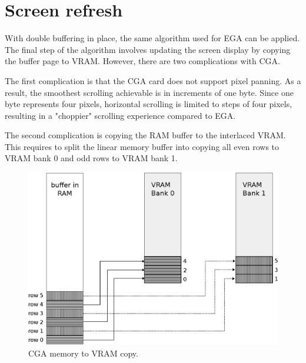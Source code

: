 \documentclass[book.tex]{subfiles}
\begin{document}
\section{Screen refresh}
With double buffering in place, the same algorithm used for EGA can be applied. The final step of the algorithm involves updating the screen display by copying the buffer page to VRAM. However, there are two complications with CGA.\\

\par
The first complication is that the CGA card does not support pixel panning. As a result, the smoothest scrolling achievable is in increments of one byte. Since one byte represents four pixels, horizontal scrolling is limited to steps of four pixels, resulting in a "choppier" scrolling experience compared to EGA. \\

\par
\begin{minipage}{\textwidth}
  
\end{minipage}
\label{state_type}

\par
The second complication is copying the RAM buffer to the interlaced VRAM. This requires to split the linear memory buffer into copying all even rows to VRAM bank 0 and odd rows to VRAM bank 1.\\

\begin{figure}[H]
\centering
\includegraphics[width=1.0\textwidth]{imgs/drawings/cga_VRAM_copy.eps}
\caption{CGA memory to VRAM copy.}
\label{fig:cga_interlaced}
\end{figure}
\end{document}

